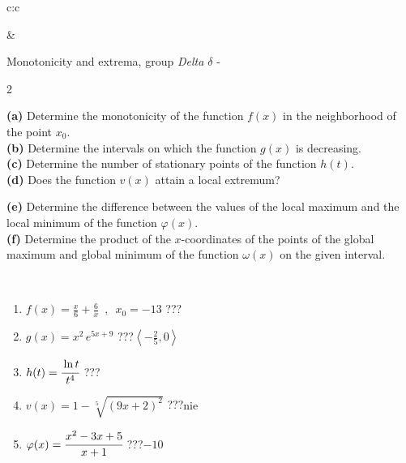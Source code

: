 \documentclass[10pt]{report}
\begin{document}
\begin{tabular}{c:c}
\begin{minipage}[c][104.5mm][t]{0.5\linewidth}
\end{minipage}
&
\begin{minipage}[c][104.5mm][t]{0.5\linewidth}
\begin{center}
\vspace{5mm}
{\huge Monotonicity and extrema, group \textit{Delta $\delta$} -}\\[5mm]
\begin{minipage}{0.95\linewidth}
\begin{center}
{\small \begin{multicols}{2} \raggedright
\textbf{(a)} Determine the monotonicity of the function \(f(x)\) in the neighborhood of the point \(x_0\). \\[1mm]
\textbf{(b)} Determine the intervals on which the function \(g(x)\) is decreasing. \\[1mm]
\textbf{(c)} Determine the number of stationary points of the function \(h(t)\). \\[1mm]
\textbf{(d)} Does the function \(v(x)\) attain a local extremum? \par \columnbreak
\textbf{(e)} Determine the difference between the values of the local maximum and the local minimum of the function \(\varphi(x)\). \\[1mm]
\textbf{(f)} Determine the product of the \(x\)-coordinates of the points of the global maximum and global minimum of the function \(\omega(x)\) on the given interval. \\[1mm]
\end{multicols}
}
\end{center}
\end{minipage}
\\[1mm]
\begin{minipage}{0.79\linewidth}
\begin{center}
\begin{varwidth}{\linewidth}
\setlength{\itemsep}{0pt}
\begin{enumerate}
\normalsize
\item $f(x)=\frac{x}{6}+\frac{6}{x} \enspace , \enspace x_0=-13$\quad \dotfill\; ???\;\dotfill \quad {}
\item $g(x)=x^2\, e^{5x+9}$\quad \dotfill\; ???\;\dotfill \quad $\left\langle-\frac{2}{5} , 0\right\rangle$
\item $h(t)=\cfrac{\ln t}{t^4}$\quad \dotfill\; ???\;\dotfill {}
\item $v(x)=1-\sqrt[5]{(9x+2)^2}$\quad \dotfill\; ???\;\dotfill \quad $\text{nie}$
\item $\varphi(x)=\cfrac{x^2-3x+5}{x+1}$\quad \dotfill\; ???\;\dotfill \quad $-10$

\end{enumerate}
\end{varwidth}
\end{center}
\end{minipage}
\end{center}
\end{minipage}
\end{tabular}
\end{document}
